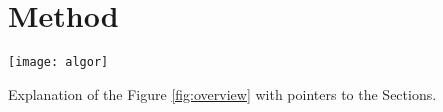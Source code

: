 \section{Method}
\begin{figure*}[t]
  \texttt{[image: algor]}
  \label{fig:overview}
\end{figure*}
Explanation of the Figure \ref{fig:overview} with pointers to the Sections.
